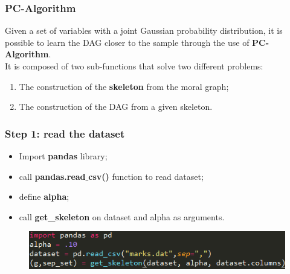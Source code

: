 \documentclass[xcolor ={table,usenames,dvipsnames}]{beamer}
\theoremstyle{definition}
\begin{document}
	\begin{frame}
		\frametitle{PC-Algorithm}
		Given a set of variables with a joint Gaussian probability distribution, it is possible to learn the DAG closer to the sample through the use of  \textbf{PC-Algorithm}. \\
		It is composed of two sub-functions that solve two different problems:
		\begin{enumerate}
			\item The construction of the \textbf{skeleton} from the moral graph;
			\item The construction of the DAG from a given skeleton.
		\end{enumerate}
	\end{frame}


	\begin{frame}
		\frametitle{Step 1: read the dataset}
		\begin{itemize}
			\item Import \textbf{pandas} library;
			\item call \textbf{pandas.read$\_$csv()} function to read dataset;
			\item define \textbf{alpha};
			\item call \textbf{get\_skeleton} on dataset and alpha as arguments.
		\end{itemize}
		\begin{figure}[h!]
			\centering
			\includegraphics[scale=0.82]{img/dataset.PNG}
		\end{figure}
		
	\end{frame}
\end{document}
